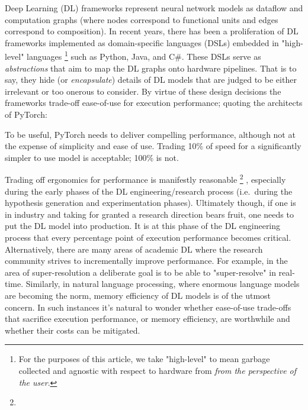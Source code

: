 \documentclass[sigconf]{acmart}
\begin{document}
Deep Learning (DL) frameworks represent neural network models as dataflow and computation graphs (where nodes correspond to functional units and edges correspond to composition).
In recent years, there has been a proliferation of DL frameworks\cite{paszke2019pytorch,abadi2016tensorflow,chen2015mxnet,cntk} implemented as domain-specific languages (DSLs) embedded in "high-level" languages%
\footnote{For the purposes of this article, we take "high-level" to mean garbage collected and agnostic with respect to hardware from \textit{from the perspective of the user}.} such as Python, Java, and C\#.
These DSLs serve as \textit{abstractions} that aim to map the DL graphs onto hardware pipelines.
That is to say, they hide (or \textit{encapsulate}) details of DL models that are judged to be either irrelevant or too onerous to consider.
By virtue of these design decisions the frameworks trade-off ease-of-use for execution performance;
quoting the architects of PyTorch:
\begin{displayquote}
  To be useful, PyTorch needs to deliver compelling performance, although not at the expense of simplicity and ease of use.
  Trading 10\% of speed for a significantly simpler to use model is acceptable; 100\% is not.
\end{displayquote}

Trading off ergonomics for performance is manifestly reasonable%
\footnote{}%
, especially during the early phases of the DL engineering/research process (i.e.\ during the hypothesis generation and experimentation phases).
Ultimately though, if one is in industry and taking for granted a research direction bears fruit, one needs to put the DL model into production.
It is at this phase of the DL engineering process that every percentage point of execution performance becomes critical.
Alternatively, there are many areas of academic DL where the research community strives to incrementally improve performance\cite{abdelhamed2020ntire,hall2020probability,ILSVRC15}.
For example, in the area of super-resolution a deliberate goal is to be able to "super-resolve" in real-time\cite{7780576}.
Similarly, in natural language processing, where enormous language models are becoming the norm\cite{brown2020language}, memory efficiency of DL models is of the utmost concern.
In such instances it's natural to wonder whether ease-of-use trade-offs that sacrifice execution performance, or memory efficiency, are worthwhile and whether their costs can be mitigated.
\end{document}
